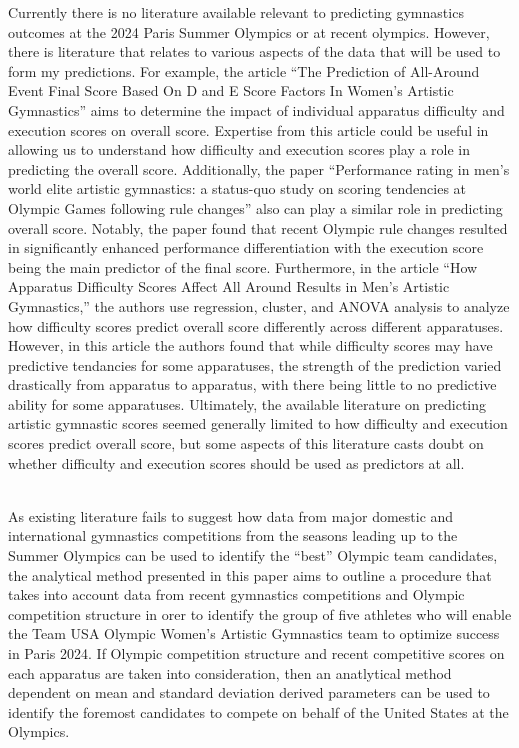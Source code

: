 \documentclass[12pt]{article}
\begin{document}
Currently there is no literature available relevant to predicting gymnastics outcomes at the 2024 
Paris Summer Olympics or at recent olympics. However, there is literature that relates to various aspects of 
the data that will be used to form my predictions. For example, the article ``The Prediction of All-Around 
Event Final Score Based On D and E Score Factors In Women's Artistic Gymnastics'' aims to determine the 
impact of individual apparatus difficulty and execution scores on overall score. 
Expertise from this article could be useful in allowing us to understand how difficulty and execution scores 
play a role in predicting the overall score. Additionally, the paper 
``Performance rating in men’s world elite artistic gymnastics: a status-quo study on scoring 
tendencies at Olympic Games following rule changes'' also can play a similar role in predicting overall 
score. Notably, the paper found that recent Olympic rule changes resulted in significantly enhanced performance 
differentiation with the execution score being the main predictor of the final score. 
Furthermore, in the article ``How Apparatus Difficulty Scores Affect All 
Around Results in Men's Artistic Gymnastics,'' the authors use regression, cluster, and ANOVA analysis to 
analyze how difficulty scores predict overall score differently across different apparatuses. However, in this 
article the authors found that while difficulty scores may have predictive tendancies for some apparatuses, 
the strength of the prediction varied drastically from apparatus to apparatus, with there being little to no 
predictive ability for some apparatuses. Ultimately, the available literature on predicting artistic 
gymnastic scores seemed generally limited to how difficulty and execution scores predict overall score, 
but some aspects of this literature casts doubt on whether difficulty and execution scores should be 
used as predictors at all.

\\

As existing literature fails to suggest how data from major domestic and international gymnastics competitions 
from the seasons leading up to the Summer Olympics can be used to identify the ``best'' Olympic team candidates, 
the analytical method presented in this paper aims to outline a procedure that takes into account data from recent 
gymnastics competitions and Olympic competition structure in orer to identify the group of five athletes who will 
enable the Team USA Olympic Women’s Artistic Gymnastics team to optimize success in Paris 2024. If Olympic 
competition structure and recent competitive scores on each apparatus are taken into consideration, then an 
anatlytical method dependent on mean and standard deviation derived parameters can be used to identify the foremost 
candidates to compete on behalf of the United States at the Olympics.
\end{document}

